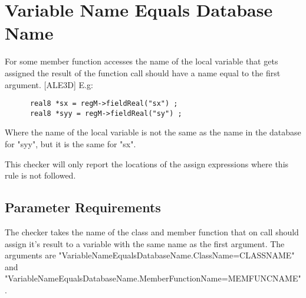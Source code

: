 %
%

\section{Variable Name Equals Database Name}
\label{VariableNameEqualsDatabaseName::overview}
For some member function accesses the name of the local variable
that gets assigned the result of the function call should have a
name equal to the first argument. [ALE3D] E.g:
\begin{verbatim}
      real8 *sx = regM->fieldReal("sx") ;
      real8 *syy = regM->fieldReal("sy") ;
\end{verbatim}	  
Where the name of the local variable is not the same as the name in the
database for "syy", but it is the same for "sx". 

This checker will only report the locations of the assign expressions
where this rule is not followed.


\subsection{Parameter Requirements}
The checker takes the name of the class and member function that
on call should assign it's result to a variable with the same name
as the first argument. The arguments are "VariableNameEqualsDatabaseName.ClassName=CLASSNAME"
and "VariableNameEqualsDatabaseName.MemberFunctionName=MEMFUNCNAME".

